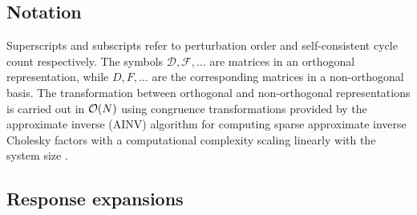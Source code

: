 \documentclass[prl,twocolumn,showpacs,twocolumngrid,superbib]{revtex4}
\begin{document}
\subsection{Notation}

Superscripts and subscripts refer to perturbation order and 
self-consistent cycle count respectively. The symbols $\mathcal{D},\mathcal{F},\dots$
are matrices in an orthogonal representation, while
$D,F,\dots$ are the corresponding matrices in a non-orthogonal basis.
The transformation between orthogonal and non-orthogonal 
representations is carried out in ${\cal O}(N)$ using
congruence transformations \cite{JWilkinson65,GStewart73} provided 
by the approximate inverse (AINV) algorithm for computing  sparse 
approximate inverse Cholesky factors with a computational complexity
scaling linearly with the system size \cite{MBenzi95,MBenzi96,MBenzi01}.

\subsection{Response expansions}
\end{document}
